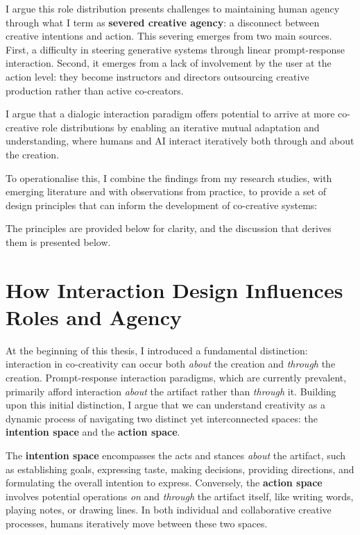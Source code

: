I argue this role distribution presents challenges to maintaining human agency through what I term as \textbf{severed creative agency}: a disconnect between creative intentions and action. This severing emerges from two main sources. First, a difficulty in steering generative systems through linear prompt-response interaction. Second, it emerges from a lack of involvement by the user at the action level: they become instructors and directors outsourcing creative production rather than active co-creators.

I argue that a dialogic interaction paradigm offers potential to arrive at more co-creative role distributions by enabling an iterative mutual adaptation and understanding, where humans and AI interact iteratively both through and about the creation.

To operationalise this, I combine the findings from my research studies, with emerging literature and with observations from practice, to provide a set of design principles that can inform the development of co-creative systems:

The principles are provided below for clarity, and the discussion that derives them is presented below.


\section{How Interaction Design Influences Roles and Agency}

At the beginning of this thesis, I introduced a fundamental distinction: interaction in co-creativity can occur both \textit{about} the creation and \textit{through} the creation. Prompt-response interaction paradigms, which are currently prevalent, primarily afford interaction \textit{about} the artifact rather than \textit{through} it. Building upon this initial distinction, I argue that we can understand creativity as a dynamic process of navigating two distinct yet interconnected spaces: the \textbf{intention space} and the \textbf{action space}.

The \textbf{intention space} encompasses the acts and stances \textit{about} the artifact, such as establishing goals, expressing taste, making decisions, providing directions, and formulating the overall intention to express. Conversely, the \textbf{action space} involves potential operations \textit{on} and \textit{through} the artifact itself, like writing words, playing notes, or drawing lines. In both individual and collaborative creative processes, humans iteratively move between these two spaces.

